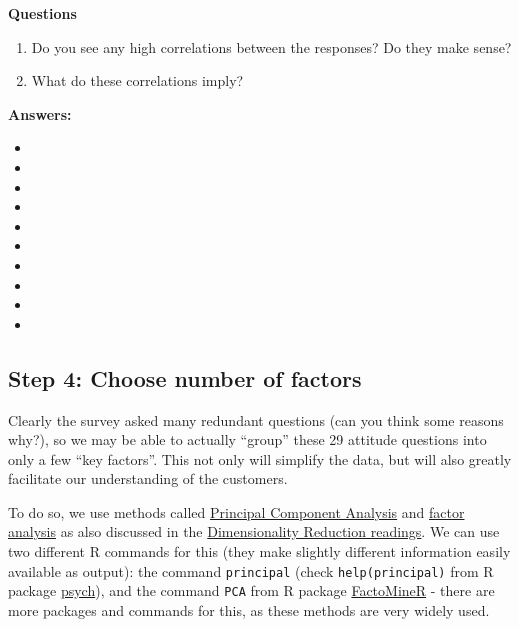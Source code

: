 \documentclass[
]{article}
\providecommand{\tightlist}{%
  \setlength{\itemsep}{0pt}\setlength{\parskip}{0pt}}
\begin{document}
\textbf{Questions}

\begin{enumerate}
\def\labelenumi{\arabic{enumi}.}
\tightlist
\item
  Do you see any high correlations between the responses? Do they make
  sense?
\item
  What do these correlations imply?
\end{enumerate}

\textbf{Answers:}

\begin{itemize}
\tightlist
\item
\item
\item
\item
\item
\item
\item
\item
\item
\item
\end{itemize}

\hypertarget{step-4-choose-number-of-factors}{%
\subsection{Step 4: Choose number of
factors}\label{step-4-choose-number-of-factors}}

Clearly the survey asked many redundant questions (can you think some
reasons why?), so we may be able to actually ``group'' these 29 attitude
questions into only a few ``key factors''. This not only will simplify
the data, but will also greatly facilitate our understanding of the
customers.

To do so, we use methods called
\href{https://en.wikipedia.org/wiki/Principal_component_analysis}{Principal
Component Analysis} and
\href{https://en.wikipedia.org/wiki/Factor_analysis}{factor analysis} as
also discussed in the
\href{http://inseaddataanalytics.github.io/INSEADAnalytics/CourseSessions/Sessions23/FactorAnalysisReading.html}{Dimensionality
Reduction readings}. We can use two different R commands for this (they
make slightly different information easily available as output): the
command \texttt{principal} (check \texttt{help(principal)} from R
package \href{http://personality-project.org/r/psych/}{psych}), and the
command \texttt{PCA} from R package
\href{http://factominer.free.fr}{FactoMineR} - there are more packages
and commands for this, as these methods are very widely used.
\end{document}
